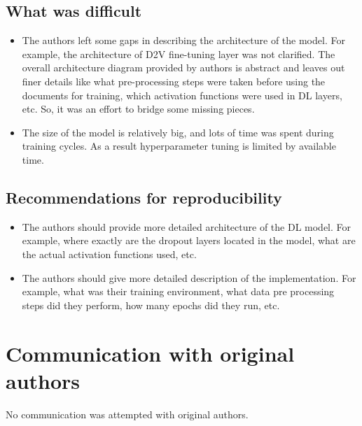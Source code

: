 \documentclass[11pt,a4paper]{article}
\begin{document}
\subsection{What was difficult}
\begin{itemize}
	\item The authors left some gaps in describing the architecture of the model. For example, the architecture of D2V fine-tuning layer was not clarified. The overall architecture diagram provided by authors is abstract and leaves out finer details like what pre-processing steps were taken before using the documents for training, which activation functions were used in DL layers, etc. So, it was an effort to bridge some missing pieces.
	\item The size of the model is relatively big, and lots of time was spent during training cycles. As a result hyperparameter tuning is limited by available time.
\end{itemize}

\subsection{Recommendations for reproducibility}
\begin{itemize}
	\item The authors should provide more detailed architecture of the DL model. For example, where exactly are the dropout layers located in the model, what are the actual activation functions used, etc.
	\item The authors should give more detailed description of the implementation. For example, what was their training environment, what data pre processing steps did they perform, how many epochs did they run, etc.
\end{itemize}


\section{Communication with original authors}

No communication was attempted with original authors.





\end{document}
